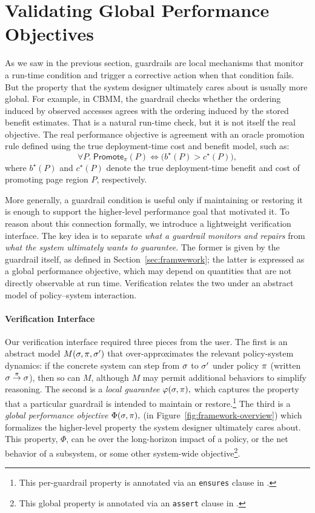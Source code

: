 \section{Validating Global Performance Objectives}\label{sec:verification}
As we saw in the previous section, guardrails are local mechanisms that monitor a run-time condition and trigger a corrective action when that condition fails. But the property that the system designer ultimately cares about is usually more global. For example, in CBMM, the guardrail checks whether the ordering induced by observed accesses agrees with the ordering induced by the stored benefit estimates. That is a natural run-time check, but it is not itself the real objective. The real performance objective is agreement with an oracle promotion rule defined using the true deployment-time cost and benefit model, such as:
\[
\forall P.\;
\mathsf{Promote}_{\pi}(P)
\iff
\bigl(b^\star(P) > c^\star(P)\bigr),
\]
where $b^\star(P)$ and $c^\star(P)$ denote the true deployment-time benefit and cost of promoting page region $P$, respectively. 

More generally, a guardrail condition is useful only if maintaining or restoring it is enough to support the higher-level performance goal that motivated it.  To reason about this connection formally, we introduce a lightweight verification interface. The key idea is to separate \emph{what a guardrail monitors and repairs} from \emph{what the system ultimately wants to guarantee}. The former is given by the guardrail itself, as defined in Section~\ref{sec:framwework}; the latter is expressed as a global performance objective, which may depend on quantities that are not directly observable at run time. Verification relates the two under an abstract model of policy--system interaction.

\paragraph{Verification Interface}

Our verification interface required three pieces from the user. The first is an abstract model
$ 
M(\sigma,{\pi},\sigma')
$ 
that over-approximates the relevant policy-system dynamics: if the concrete system can step from $\sigma$ to $\sigma'$ under policy ${\pi}$ (written ${\sigma}\overset{{\pi}}{\to}{\sigma}$), then so can $M$, although $M$ may permit additional behaviors to simplify reasoning. The second is a \emph{local guarantee}
$ 
\varphi(\sigma,{\pi}),
$
which captures the property that a particular guardrail is intended to maintain or restore.\footnote{This per-guardrail property is annotated via an \texttt{ensures} clause in \lang.} The third is a \emph{global performance objective}
 $
\Phi(\sigma,{\pi}),
$ (\perfsafety in Figure~\ref{fig:framework-overview})
which formalizes the higher-level property the system designer ultimately cares about.
This \perfsafety property, $\Phi$, can be over the long-horizon impact of a policy, or the net behavior of a subsystem, or some other system-wide objective\footnote{This global property is annotated via an \texttt{assert} clause in \lang.}.
